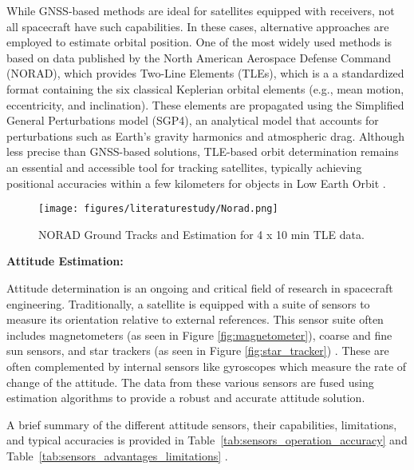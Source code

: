\noindent
While GNSS-based methods are ideal for satellites equipped with receivers, not all spacecraft have such capabilities. In these cases, alternative approaches are employed to estimate orbital position. One of the most widely used methods is based on data published by the North American Aerospace Defense Command (NORAD), which provides Two-Line Elements (TLEs), which is a a standardized format containing the six classical Keplerian orbital elements (e.g., mean motion, eccentricity, and inclination). These elements are propagated using the Simplified General Perturbations model (SGP4), an analytical model that accounts for perturbations such as Earth’s gravity harmonics and atmospheric drag. Although less precise than GNSS-based solutions, TLE-based orbit determination remains an essential and accessible tool for tracking satellites, typically achieving positional accuracies within a few kilometers for objects in Low Earth Orbit \cite{Kahr2013,Hoots2004,Goh2018}.

\begin{figure}[H]
\centering
\texttt{[image: figures/literaturestudy/Norad.png]}
\caption{NORAD Ground Tracks and Estimation for 4 x 10 min TLE data. \cite{Kahr2013}}
\label{fig:gnss_concept}
\end{figure}

\noindent
\textbf{Attitude Estimation:}

\noindent
Attitude determination is an ongoing and critical field of research in spacecraft engineering. Traditionally, a satellite is equipped with a suite of sensors to measure its orientation relative to external references. This sensor suite often includes magnetometers (as seen in Figure \ref{fig:magnetometer}), coarse and fine sun sensors, and star trackers (as seen in Figure \ref{fig:star_tracker}) \cite{Bennett2021,Zahran,Liebe1995}. These are often complemented by internal sensors like gyroscopes which measure the rate of change of the attitude. The data from these various sensors are fused using estimation algorithms to provide a robust and accurate attitude solution.
\vspace{0.5cm}

\noindent
A brief summary of the different attitude sensors, their capabilities, limitations, and typical accuracies is provided in Table~\ref{tab:sensors_operation_accuracy} and Table~\ref{tab:sensors_advantages_limitations} \cite{Springmann}.

